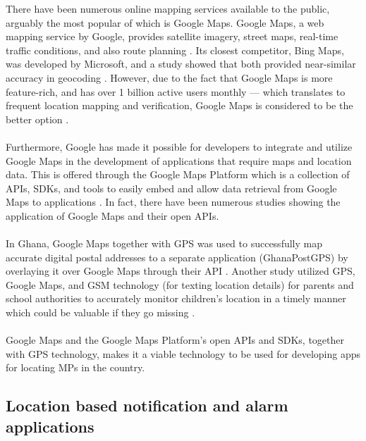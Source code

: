 There have been numerous online mapping services available to the public, arguably the most popular of which is Google Maps. Google Maps, a web mapping service by Google, provides satellite imagery, street maps, real-time traffic conditions, and also route planning \cite{antony_2021}. Its closest competitor, Bing Maps, was developed by Microsoft, and a study showed that both provided near-similar accuracy in geocoding \cite{kilic2020accuracy}. However, due to the fact that Google Maps is more feature-rich, and has over 1 billion active users monthly — which translates to frequent location mapping and verification, Google Maps is considered to be the better option \cite{lookingbill2019google}.
\\\\Furthermore, Google has made it possible for developers to integrate and utilize Google Maps in the development of applications that require maps and location data. This is offered through the Google Maps Platform which is a collection of APIs, SDKs, and tools to easily embed and allow data retrieval from Google Maps to applications \cite{googleDevelopers}. In fact, there have been numerous studies showing the application of Google Maps and their open APIs. 
\\\\In Ghana, Google Maps together with GPS was used to successfully map accurate digital postal addresses to a separate application (GhanaPostGPS) by overlaying it over Google Maps through their API \cite{gah2018using}. Another study utilized GPS, Google Maps, and GSM technology (for texting location details) for parents and school authorities to accurately monitor children’s location in a timely manner which could be valuable if they go missing \cite{sunehra2016children}.
\\\\Google Maps and the Google Maps Platform’s open APIs and SDKs, together with GPS technology, makes it a viable technology to be used for developing apps for locating MPs in the country.


\subsection{Location based notification and alarm applications}

